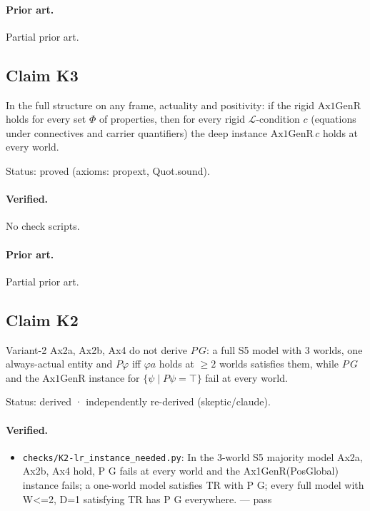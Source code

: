 \documentclass{article}
\begin{document}
\paragraph{Prior art.} Partial prior art.

\subsection*{Claim K3}

In the full structure on any frame, actuality and positivity: if the rigid $\mathrm{Ax1GenR}$ holds for every set $\Phi$ of properties, then for every rigid $\mathcal L$-condition $c$ (equations under connectives and carrier quantifiers) the deep instance $\mathrm{Ax1GenR}\,c$ holds at every world.

Status: proved (axioms: propext, Quot.sound).

\paragraph{Verified.}
No check scripts.

\paragraph{Prior art.} Partial prior art.

\subsection*{Claim K2}

Variant-2 Ax2a, Ax2b, Ax4 do not derive $P\,G$: a full S5 model with 3 worlds, one always-actual entity and $P\varphi$ iff $\varphi a$ holds at $\ge 2$ worlds satisfies them, while $P\,G$ and the $\mathrm{Ax1GenR}$ instance for $\{\psi\mid P\psi=\top\}$ fail at every world.

Status: derived · independently re-derived (skeptic/claude).

\paragraph{Verified.}
\begin{itemize}
\item \texttt{checks/K2-lr\_instance\_needed.py}: In the 3-world S5 majority model Ax2a, Ax2b, Ax4 hold, P G fails at every world and the Ax1GenR(PosGlobal) instance fails; a one-world model satisfies TR with P G; every full model with \textbar{}W\textbar{}\textless{}=2, \textbar{}D\textbar{}=1 satisfying TR has P G everywhere. --- pass
\end{itemize}
\end{document}
